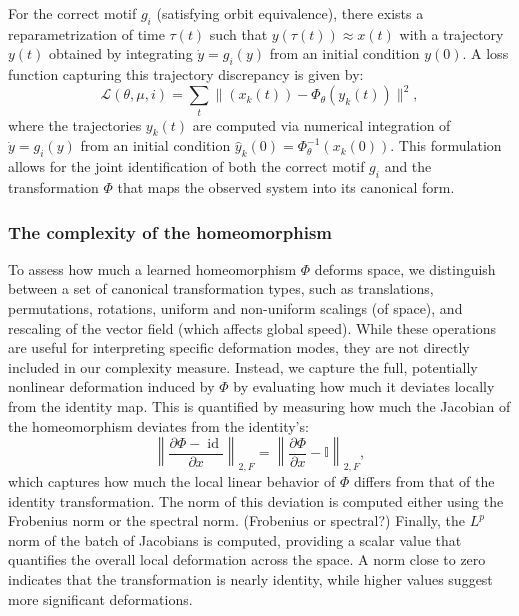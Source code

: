 \documentclass{article}
\newcommand{\ascomment}[1]{\textcolor{ascolor}{(#1)}}
\theoremstyle{definition} \newtheorem{definition}{Definition}  \newtheorem{example}{Example}
\theoremstyle{remark} \newtheorem{remark}{Remark}
\newcounter{ct}
\newcommand{\field}[1]{\ensuremath{\mathbb{#1}}}
\newcommand{\reals}{\field{R}}
\begin{document}
For the correct motif \( g_i \)  (satisfying orbit equivalence), there exists a reparametrization of time \( \tau(t) \) such that \(y(\tau(t)) \approx x(t)\)
with a trajectory \( y(t) \)  obtained by integrating \( \dot{y} = g_i(y) \) from an initial condition \( y(0) \). 
A loss function capturing this trajectory discrepancy is given by:
\begin{equation}\label{eq:loss}
\mathcal{L}(\theta, \mu, i) = \sum_{t} \Big\| (x_k(t)) - \Phi_\theta(y_k(t)) \Big\|^2,
\end{equation}
where the trajectories \(y_k(t) \) are computed via numerical integration of \(\dot y =  g_i(y) \) from an initial condition $\hat y_k(0) = \Phi_\theta^{-1}(x_k(0))$. %
This formulation allows for the joint identification of both the correct motif \( g_i \) and the transformation \( \Phi \) that maps the observed system into its canonical form.



\subsubsection{The complexity of the homeomorphism}
To assess how much a learned homeomorphism $\Phi$ deforms space, we distinguish between a set of canonical transformation types, such as translations, permutations, rotations, uniform and non-uniform scalings (of space), and rescaling of the vector field (which affects global speed).
 While these operations are useful for interpreting specific deformation modes, they are not directly included in our complexity measure.
Instead, we capture the full, potentially nonlinear deformation induced by $\Phi$ by evaluating how much it deviates locally from the identity map.
 This is quantified by measuring how much the Jacobian of the homeomorphism deviates from the identity's:
\begin{equation}\label{sec:jacobian_minid}
\left\|\frac{\partial \Phi - \operatorname{id}}{\partial x}\right\|_{2,F} = \left\|\frac{\partial \Phi}{\partial x} - \mathbb{I}\right\|_{2,F},
\end{equation}
which captures how much the local linear behavior of $\Phi$ differs from that of the identity transformation.
The norm of this deviation is computed either using the Frobenius norm or the spectral norm. \ascomment{Frobenius or spectral?}
Finally, the \( L^p \) norm of the batch of Jacobians is computed, providing a scalar value that quantifies the overall local deformation across the space. A norm close to zero indicates that the transformation is nearly identity, while higher values suggest more significant deformations.
\end{document}
